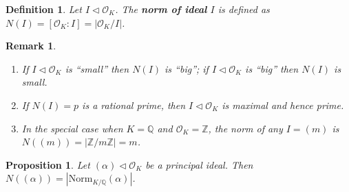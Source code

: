 \documentclass[11pt]{book}
\newtheorem{definition}[theorem]{Definition}
\newtheorem{proposition}[theorem]{Proposition}
\newtheorem{remark}[theorem]{Remark}
\begin{document}
\begin{definition}
    Let $I\lhd \mathcal{O}_{K}$. The {\bf norm of ideal} $I$ is defined as $N(I)=[\mathcal{O}_{K}:I]=\left| \mathcal{O}_{K} /I \right| $. 
\end{definition}

\begin{remark}
    \begin{enumerate}
        \item If $I\lhd \mathcal{O}_{K}$ is ``small'' then $N(I)$ is ``big''; if $I\lhd \mathcal{O}_{K}$ is ``big'' then $N(I)$ is small. 
        \item If $N(I)=p$ is a rational prime, then $I\lhd \mathcal{O}_{K}$ is maximal and hence prime. 
        \item In the special case when $K=\mathbb{Q}$ and $\mathcal{O}_{K}=\mathbb{Z}$, the norm of any $I=(m)$ is $N((m))=\left| \mathbb{Z} /m\mathbb{Z} \right| =m$. 
    \end{enumerate}
\end{remark}

\begin{proposition}
    Let $(\alpha)\lhd \mathcal{O}_{K}$ be a principal ideal. Then $N((\alpha))=\left| \mathrm{Norm}_{K /\mathbb{Q}}(\alpha) \right| $. 
\end{proposition}
\end{document}
